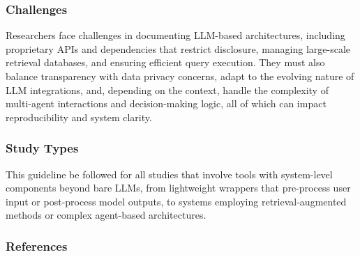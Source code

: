 \subsubsection{Challenges}

Researchers face challenges in documenting LLM-based architectures, including proprietary APIs and dependencies that restrict disclosure, managing large-scale retrieval databases, and ensuring efficient query execution.
They must also balance transparency with data privacy concerns, adapt to the evolving nature of LLM integrations, and, depending on the context, handle the complexity of multi-agent interactions and decision-making logic, all of which can impact reproducibility and system clarity.

\subsubsection{Study Types}

This guideline \must be followed for all studies that involve tools with system-level components beyond bare LLMs, from lightweight wrappers that pre-process user input or post-process model outputs, to systems employing retrieval-augmented methods or complex agent-based architectures.

\subsubsection{References}





